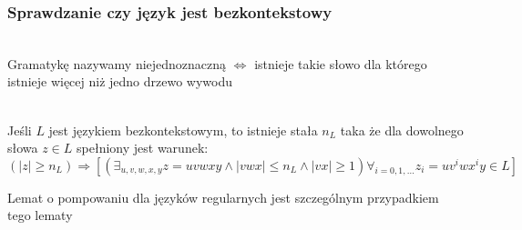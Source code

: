 \subsubsection{Sprawdzanie czy język jest bezkontekstowy}

	\begin{df}~\\
		Gramatykę nazywamy niejednoznaczną $\Leftrightarrow$ istnieje takie słowo dla którego istnieje więcej niż jedno drzewo wywodu		
	\end{df}
	
	\begin{lemat}~\\
		Jeśli $L$ jest językiem bezkontekstowym, to istnieje stała $n_L$ taka że dla
		dowolnego słowa $z\in L$ spełniony jest warunek:
		$$
			(|z| \geqslant n_L) \Rightarrow [( \exists_{u,v,w,x,y} z = uvwxy \wedge |vwx| \leqslant n_L \wedge |vx| \geqslant 1) \forall_{i=0,1,\dots} z_i = uv^iwx^iy \in L]
		$$
		\begin{uwaga}
			Lemat o pompowaniu dla języków regularnych jest szczególnym przypadkiem tego lematy
		\end{uwaga}
		

\end{lemat}
